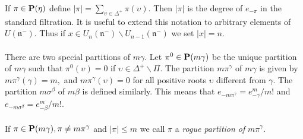 \documentclass{article}
\newcommand{\gb}{\beta}
\newcommand{\gc}{\gamma}
\newcommand{\gs}{\sigma}
\begin{document}
If $\pi \in \bf{{P}(\eta)}$  define  $|\pi| = \sum_{\upsilon \in \Delta^+} \pi(\upsilon).$ Then 
 $|\pi|$ is the degree of $e_{-\pi}$ in the standard filtration.  It is useful to extend this notation to arbitrary elements of 
$U(\mathfrak{n}^-)$. Thus if $x\in 
U_n(\mathfrak{n}^-) \backslash 
U_{n-1}(\mathfrak{n}^-)$ we set $|x|=n.$
\\ \\
There are two special partitions of $m\gc$. Let
$\pi^0 \in {{\bf P}}(m\gc)$ be the unique partition of $m\gc$ such
that $\pi^0(\upsilon) = 0$ if $\upsilon \in \Delta^+ \backslash \Pi .$ The partition $m\pi^{\gc}$ of $m\gc$ is given by $m\pi^{\gc}(\gc)=m,$ and $m\pi^\gc(\upsilon)= 0$ for all positive roots $\upsilon$ different from $\gc.$
The partition $m\gs^{\gb}$ of $m\gb$ is defined similarly. 
This means that $e_{-m\pi^{\gc}} =e_{-\gc}^m/m!$ 
and  $e_{-m\gs^{\gb}} =e_{-\gb}^m/m!$. 
\\ \\
If { $\pi \in {{\bf P}}(m\gc), \pi \neq
m\pi^{\gc}$ and  $|\pi|\le m$} we call $\pi$   a {\it rogue partition of }$
{m\pi^{\gc}}.$ 
\end{document}
